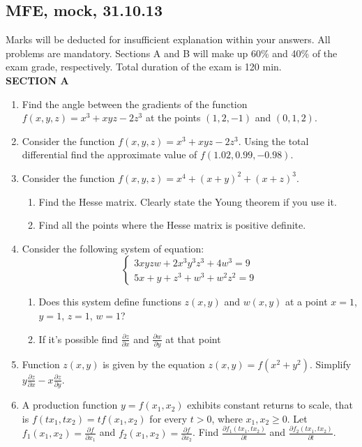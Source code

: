 
\subsection{MFE, mock, 31.10.13}

Marks will be deducted for insufficient explanation within your answers. All problems are mandatory. Sections A and B will make up 60\% and 40\% of the exam grade, respectively. Total duration of the exam is 120 min. \\

\textbf{SECTION A}

\begin{enumerate}

\item Find the angle between the gradients of the function $f(x,y,z)=x^3+xyz-2z^3$ at the points $(1,2,-1)$ and $(0,1,2)$.

\item Consider the function $f(x,y,z)=x^3+xyz-2z^3$. Using the total differential find the approximate value of $f(1.02,0.99,-0.98)$.

\item Consider the function $f(x,y,z)=x^4+(x+y)^2+(x+z)^3$.
\begin{enumerate}
\item Find the Hesse matrix. Clearly state the Young theorem if you use it.
\item Find all the points where the Hesse matrix is positive definite.
\end{enumerate}

\item Consider the following system of equation:
\[
\begin{cases}
3xyzw+2x^3y^3z^3+4w^3=9\\
5x+y+z^3+w^3+w^2z^2=9
\end{cases}
\]
\begin{enumerate}
\item Does this system define functions $z(x,y)$ and $w(x,y)$ at a point $x=1$, $y=1$, $z=1$, $w=1$?
\item If it's possible find $\frac{\partial z}{\partial x}$ and $\frac{\partial w}{\partial y}$ at that point
\end{enumerate}

\item Function $z(x,y)$ is given by the equation $z(x,y)=f(x^2+y^2)$. Simplify $y\frac{\partial z}{\partial x}-x\frac{\partial z}{\partial y}$.

\item A production function $y=f(x_1,x_2)$ exhibits constant returns to scale, that is $f(tx_1,tx_2)=tf(x_1,x_2)$ for every $t>0$, where $x_1, x_2 \geq 0$. Let $f_1(x_1,x_2)=\frac{\partial f}{\partial x_1}$ and $f_2(x_1,x_2)=\frac{\partial f}{\partial x_2}$. Find $\frac{\partial f_1(tx_1,tx_2)}{\partial t}$ and $\frac{\partial f_2(tx_1,tx_2)}{\partial t}$.

\end{enumerate}

